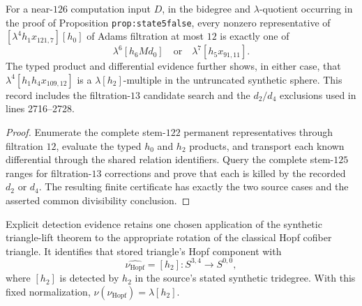 \begin{proposition}
  \label{evidence:stem122-product-exhaustion}
  \notready
  For a near-$126$ computation input $D$, in the bidegree and
  $\lambda$-quotient occurring in the proof of
  Proposition \texttt{prop:state5false}, every nonzero representative of
  $[\lambda^4h_1x_{121,7}][h_0]$ of Adams filtration at most $12$ is exactly
  one of
  \[
    \lambda^6[h_6Md_0]\quad\text{or}\quad
    \lambda^7[h_5x_{91,11}].
  \]
  The typed product and differential evidence further shows, in either case,
  that $\lambda^4[h_1h_4x_{109,12}]$ is a
  $\lambda[h_2]$-multiple in the untruncated synthetic sphere.  This record
  includes the filtration-$13$ candidate search and the $d_2/d_4$ exclusions
  used in lines 2716--2728.
\end{proposition}

\begin{proof}
  Enumerate the complete stem-$122$ permanent representatives through
  filtration $12$, evaluate the typed $h_0$ and $h_2$ products, and transport
  each known differential through the shared relation identifiers.  Query the
  complete stem-$125$ ranges for filtration-$13$ corrections and prove that
  each is killed by the recorded $d_2$ or $d_4$.  The resulting finite
  certificate has exactly the two source cases and the asserted common
  divisibility conclusion.
\end{proof}

\begin{proposition}
  \label{evidence:normalized-hopf-detection}
  \notready
  Explicit detection evidence retains one chosen application of the synthetic
  triangle-lift theorem to the appropriate rotation of the classical Hopf
  cofiber triangle.  It identifies that stored triangle's Hopf component with
  \[
    \widehat{\nu_{\mathrm{Hopf}}}=[h_2]:S^{3,4}\longrightarrow S^{0,0},
  \]
  where $[h_2]$ is detected by $h_2$ in the source's stated synthetic
  tridegree.  With this fixed normalization,
  $\nu(\nu_{\mathrm{Hopf}})=\lambda[h_2]$.
\end{proposition}

